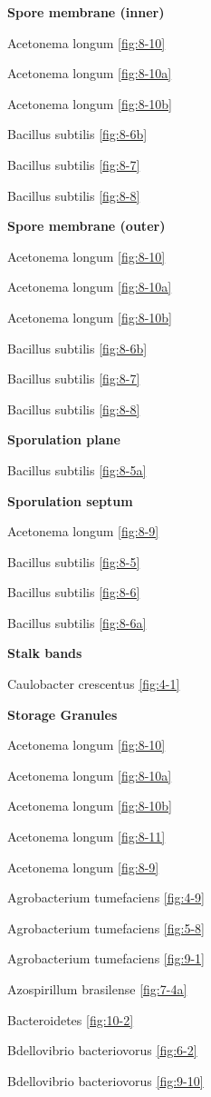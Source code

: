 \documentclass[]{tufte-book}
\begin{document}
\textbf{Spore membrane (inner)}

Acetonema longum \ref{fig:8-10}

Acetonema longum \ref{fig:8-10a}

Acetonema longum \ref{fig:8-10b}

Bacillus subtilis \ref{fig:8-6b}

Bacillus subtilis \ref{fig:8-7}

Bacillus subtilis \ref{fig:8-8}

\textbf{Spore membrane (outer)}

Acetonema longum \ref{fig:8-10}

Acetonema longum \ref{fig:8-10a}

Acetonema longum \ref{fig:8-10b}

Bacillus subtilis \ref{fig:8-6b}

Bacillus subtilis \ref{fig:8-7}

Bacillus subtilis \ref{fig:8-8}

\textbf{Sporulation plane}

Bacillus subtilis \ref{fig:8-5a}

\textbf{Sporulation septum}

Acetonema longum \ref{fig:8-9}

Bacillus subtilis \ref{fig:8-5}

Bacillus subtilis \ref{fig:8-6}

Bacillus subtilis \ref{fig:8-6a}

\textbf{Stalk bands}

Caulobacter crescentus \ref{fig:4-1}

\textbf{Storage Granules}

Acetonema longum \ref{fig:8-10}

Acetonema longum \ref{fig:8-10a}

Acetonema longum \ref{fig:8-10b}

Acetonema longum \ref{fig:8-11}

Acetonema longum \ref{fig:8-9}

Agrobacterium tumefaciens \ref{fig:4-9}

Agrobacterium tumefaciens \ref{fig:5-8}

Agrobacterium tumefaciens \ref{fig:9-1}

Azospirillum brasilense \ref{fig:7-4a}

Bacteroidetes \ref{fig:10-2}

Bdellovibrio bacteriovorus \ref{fig:6-2}

Bdellovibrio bacteriovorus \ref{fig:9-10}
\end{document}
